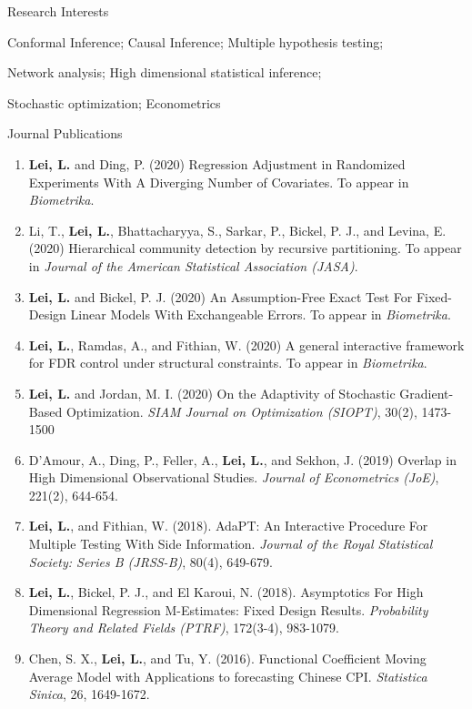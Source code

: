 \documentclass{article}
\begin{document}
\begin{large}
\noindent Research Interests
\end{large}

\vspace{3mm}
Conformal Inference; Causal Inference; Multiple hypothesis testing;

Network analysis; High dimensional statistical inference; 

Stochastic optimization; Econometrics

\vspace{3mm}

\begin{large}
\noindent Journal Publications
\end{large}

\begin{enumerate}
\item \textbf{Lei, L.} and Ding, P. (2020) Regression Adjustment in Randomized Experiments With A Diverging Number of Covariates. To appear in \emph{Biometrika}.
\item Li, T., \textbf{Lei, L.}, Bhattacharyya, S., Sarkar, P., Bickel, P. J., and Levina, E. (2020) Hierarchical community detection by recursive partitioning. To appear in \emph{Journal of the American Statistical Association (JASA)}.
\item \textbf{Lei, L.} and Bickel, P. J. (2020) An Assumption-Free Exact Test For Fixed-Design Linear Models With Exchangeable Errors. To appear in \emph{Biometrika}.
\item \textbf{Lei, L.}, Ramdas, A., and Fithian, W. (2020) A general interactive framework for FDR control under structural constraints. To appear in \emph{Biometrika}.
\item \textbf{Lei, L.} and Jordan, M. I. (2020) On the Adaptivity of Stochastic Gradient-Based Optimization. \emph{SIAM Journal on Optimization (SIOPT)}, 30(2), 1473-1500
\item D'Amour, A., Ding, P., Feller, A., \textbf{Lei, L.}, and Sekhon, J. (2019) Overlap in High Dimensional Observational Studies. \emph{Journal of Econometrics (JoE)}, 221(2), 644-654.
\item \textbf{Lei, L.}, and Fithian, W. (2018). AdaPT: An Interactive Procedure For Multiple Testing With Side Information. \emph{Journal of the Royal Statistical Society: Series B (JRSS-B)}, 80(4), 649-679.
\item \textbf{Lei, L.}, Bickel, P. J., and El Karoui, N. (2018). Asymptotics For High Dimensional Regression M-Estimates: Fixed Design Results. \emph{Probability Theory and Related Fields (PTRF)}, 172(3-4), 983-1079.
\item Chen, S. X., \textbf{Lei, L.}, and Tu, Y. (2016). Functional Coefficient Moving Average Model with Applications to forecasting Chinese CPI. \emph{Statistica Sinica}, 26, 1649-1672.
\end{enumerate}
\end{document}
